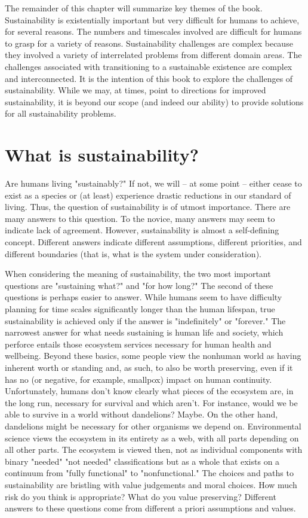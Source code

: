 \documentclass{book}\usepackage[]{graphicx}\usepackage[]{color}
\begin{document}
The remainder of this chapter will summarize key themes of the book. Sustainability is existentially important but very difficult for humans to achieve, for several reasons. The numbers and timescales involved are difficult for humans to grasp for a variety of reasons. Sustainability challenges are complex because they involved a variety of interrelated problems from different domain areas. The challenges associated with transitioning to a sustainable existence are complex and interconnected. It is the intention of this book to explore the challenges of sustainability. While we may, at times, point to directions for improved sustainability, it is beyond our scope (and indeed our ability) to provide solutions for all sustainability problems. 

\section{What is sustainability?}
Are humans living "sustainably?" If not, we will -- at some point -- either cease to exist as a species or (at least) experience drastic reductions in our standard of living. Thus, the question of sustainability is of utmost importance. There are many answers to this question. To the novice, many answers may seem to indicate lack of agreement. However, sustainability is almost a self-defining concept. Different answers indicate different assumptions, different priorities, and different boundaries (that is, what is the system under consideration). 

When considering the meaning of sustainability, the two most important questions are "sustaining what?" and "for how long?" The second of these questions is perhaps easier to answer. While humans seem to have difficulty planning for time scales significantly longer than the human lifespan, true sustainability is achieved only if the answer is "indefinitely" or "forever."
The narrowest answer for what needs sustaining is human life and society, which perforce entails those ecosystem services necessary for human health and wellbeing. Beyond these basics, some people view the nonhuman world as having inherent worth or standing and, as such, to also be worth preserving, even if it has no (or negative, for example, smallpox) impact on human continuity. Unfortunately, humans don’t know clearly what pieces of the ecosystem are, in the long run, necessary for survival and which aren’t. For instance, would we be able to survive in a world without dandelions? Maybe. On the other hand, dandelions might be necessary for other organisms we depend on. Environmental science views the ecosystem in its entirety as a web, with all parts depending on all other parts. The ecosystem is viewed then, not as individual components with binary "needed" "not needed" classifications but as a whole that exists on a continuum from "fully functional" to "nonfunctional." The choices and paths to sustainability are bristling with value judgements and moral choices. How much risk do you think is appropriate? What do you value preserving? Different answers to these questions come from different a priori assumptions and values. 
\end{document}
